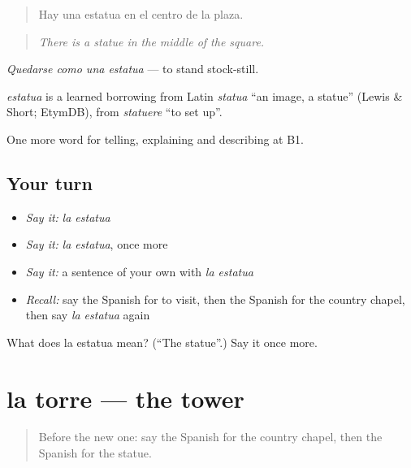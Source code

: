 \begin{quote}
Hay una estatua en el centro de la plaza.
\end{quote}

\begin{quote}
\emph{There is a statue in the middle of the square.}
\end{quote}

\emph{Quedarse como una estatua} — to stand stock-still.

\begin{cousinweb}
\emph{estatua} is a learned borrowing from Latin \emph{statua} \textquotedblleft{}an image, a statue\textquotedblright{} (Lewis \& Short; EtymDB), from \emph{statuere} \textquotedblleft{}to set up\textquotedblright{}.
\end{cousinweb}

\begin{grammarlens}[title={What you've built}]
One more word for telling, explaining and describing at B1.
\end{grammarlens}

\subsection*{Your turn}
\begin{itemize}
\raggedright
  \item \emph{Say it:} \emph{la estatua}
  \item \emph{Say it:} \emph{la estatua}, once more
  \item \emph{Say it:} a sentence of your own with \emph{la estatua}
  \item \emph{Recall:} say the Spanish for to visit, then the Spanish for the country chapel, then say \emph{la estatua} again
\end{itemize}

\begin{tcolorbox}[breakable,colback=teal!4,colframe=teal!35!black,title={Before you move on}]
What does la estatua mean? (\textquotedblleft{}The statue\textquotedblright{}.) Say it once more.
\end{tcolorbox}
\section[la torre]{la torre — the tower}

\label{lesson:ES-C678-torre}



\begin{quote}
Before the new one: say the Spanish for the country chapel, then the Spanish for the statue.
\end{quote}


